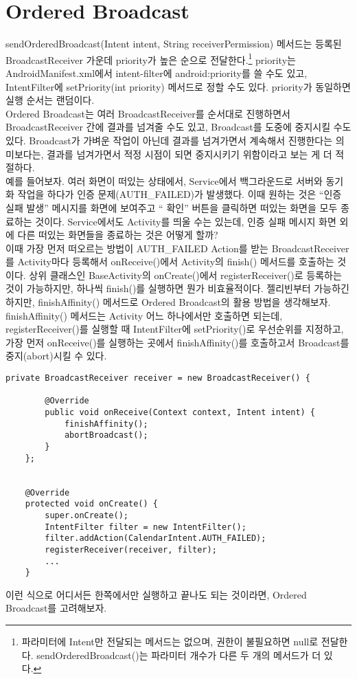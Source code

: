 \section{Ordered Broadcast}
sendOrderedBroadcast(Intent intent, String receiverPermission) 메서드는 등록된 BroadcastReceiver 가운데 priority가 높은 순으로 전달한다.\footnote{파라미터에 Intent만 전달되는 메서드는 없으며, 권한이 불필요하면 null로 전달한다. sendOrderedBroadcast()는 파라미터 개수가 다른 두 개의 메서드가 더 있다.}
priority는 AndroidManifest.xml에서 intent-filter에 android:priority를 쓸 수도 있고, IntentFilter에 setPriority(int priority) 메서드로 정할 수도 있다. priority가 동일하면 실행 순서는 랜덤이다.\\

Ordered Broadcast는 여러 BroadcastReceiver를 순서대로 진행하면서  BroadcastReceiver 간에 결과를 넘겨줄 수도 있고, Broadcast를 도중에 중지시킬 수도 있다. Broadcast가 가벼운 작업이 아닌데 결과를 넘겨가면서 계속해서 진행한다는 의미보다는, 결과를 넘겨가면서 적정 시점이 되면 중지시키기 위함이라고 보는 게 더 적절하다.\\

예를 들어보자. 여러 화면이 떠있는 상태에서, Service에서 백그라운드로 서버와 동기화 작업을 하다가 인증 문제(AUTH\_FAILED)가 발생했다. 이때 원하는 것은 ``인증 실패 발생'' 메시지를 화면에 보여주고 `` 확인'' 버튼을 클릭하면 떠있는 화면을 모두 종료하는 것이다.
Service에서도 Activity를 띄울 수는 있는데, 인증 실패 메시지 화면 외에 다른 떠있는 화면들을 종료하는 것은 어떻게 할까?\\

이때 가장 먼저 떠오르는 방법이 AUTH\_FAILED Action를 받는 BroadcastReceiver를 Activity마다 등록해서 onReceive()에서 Activity의 finish() 메서드를 호출하는 것이다.
상위 클래스인 BaseActivity의 onCreate()에서 registerReceiver()로 등록하는 것이 가능하지만, 하나씩 finish()를 실행하면 뭔가 비효율적이다. 젤리빈부터 가능하긴 하지만, finishAffinity() 메서드로 Ordered Broadcast의 활용 방법을 생각해보자.\\

finishAffinity() 메서드는 Activity 어느 하나에서만 호출하면 되는데, registerReceiver()를 실행할 때 IntentFilter에 setPriority()로 우선순위를 지정하고, 가장 먼저 onReceive()를 실행하는 곳에서 finishAffinity()를 호출하고서 Broadcast를 중지(abort)시킬 수 있다.

\begin{lstlisting}[frame=single] 
	private BroadcastReceiver receiver = new BroadcastReceiver() {
		
		@Override
		public void onReceive(Context context, Intent intent) {
			finishAffinity();
			abortBroadcast();
		}
	};
	

	@Override
	protected void onCreate() {
		super.onCreate();
		IntentFilter filter = new IntentFilter();
		filter.addAction(CalendarIntent.AUTH_FAILED);
		registerReceiver(receiver, filter);
		...
	}
\end{lstlisting}
이런 식으로 어디서든 한쪽에서만 실행하고 끝나도 되는 것이라면, Ordered Broadcast를 고려해보자.

